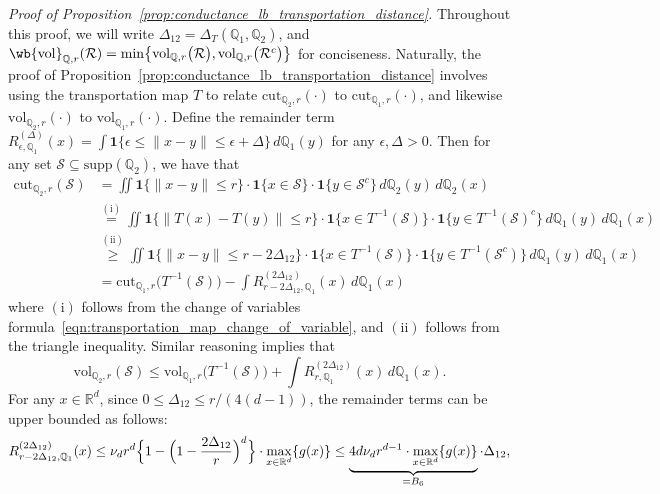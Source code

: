\documentclass[twoside,11pt]{article}
\newcommand{\Reals}{\mathbb{R}}
\newcommand{\1}{\mathbf{1}}
\newcommand{\Rd}{\Reals^d}
\newcommand{\mc}[1]{\mathcal{#1}}
\newcommand{\mbb}[1]{\mathbb{#1}}
\newcommand{\vol}{\mathrm{vol}}
\newcommand{\cut}{\mathrm{cut}}
\begin{document}
\noindent \emph{Proof of Proposition~\ref{prop:conductance_lb_transportation_distance}.}
Throughout this proof, we will write $\Delta_{12} = \Delta_T(\mbb{Q}_1,\mbb{Q}_2)$, and $\wb{\vol}_{\mbb{Q},r}(\mc{R}) = \min\bigl\{\vol_{\mbb{Q},r}\bigl(\mc{R}\bigr),\vol_{\mbb{Q},r}\bigl(\mc{R}^c\bigr)\bigr\}$ for conciseness. Naturally, the proof of Proposition~\ref{prop:conductance_lb_transportation_distance} involves using the transportation map $T$ to relate $\cut_{\mbb{Q}_2,r}(\cdot)$ to $\cut_{\mbb{Q}_1,r}(\cdot)$, and likewise $\vol_{\mbb{Q}_2,r}(\cdot)$ to $\vol_{\mbb{Q}_1,r}(\cdot)$. Define the remainder term $R_{\epsilon,\mbb{Q}_1}^{(\Delta)}(x) = \int \1\{\epsilon \leq \|x - y\| \leq \epsilon + \Delta\} \,d\mbb{Q}_1(y)$ for any $\epsilon, \Delta > 0$. Then for any set $\mc{S} \subseteq \mathrm{supp}(\mbb{Q}_2)$, we have that
\begin{align}
\cut_{\mbb{Q}_2,r}(\mc{S}) & = \iint \1\{\|x - y\|\leq r\} \cdot \1\{x \in \mc{S} \} \cdot \1\{y \in \mc{S}^c \} \,d\mbb{Q}_2(y) \,d\mbb{Q}_2(x) \nonumber \\ 
& \overset{\mathrm{(i)}}{=} \iint \1\{\|T(x) - T(y)\|\leq r\} \cdot \1\{x \in T^{-1}(\mc{S}) \} \cdot \1\{y \in T^{-1}(\mc{S})^c \} \,d\mbb{Q}_1(y) \,d\mbb{Q}_1(x) \nonumber \\
& \overset{\mathrm{(ii)}}{\geq} \iint \1\{\|x - y\|\leq r - 2\Delta_{12}\} \cdot \1\{x \in T^{-1}(\mc{S}) \} \cdot \1\{y \in T^{-1}(\mc{S}^c) \} \,d\mbb{Q}_1(y) \,d\mbb{Q}_1(x) \nonumber \\
& = \cut_{\mbb{Q}_1,r}\bigl(T^{-1}(\mc{S})\bigr) - \int R_{r - 2\Delta_{12} ,\mbb{Q}_1}^{(2\Delta_{12})}(x) \,d\mbb{Q}_1(x) \label{pf:conductance_lb_transportation_distance_1}
\end{align} 
where $\mathrm{(i)}$ follows from the change of variables formula~\eqref{eqn:transportation_map_change_of_variable}, and $\mathrm{(ii)}$ follows from the triangle inequality. Similar reasoning implies that
\begin{equation}
\label{pf:conductance_lb_transportation_distance_2}
\vol_{\mbb{Q}_2,r}(\mc{S}) \leq \vol_{\mbb{Q}_1,r}\bigl(T^{-1}(\mc{S})\bigr) + \int R_{r,\mbb{Q}_1}^{(2\Delta_{12})}(x)  \,d\mbb{Q}_1(x).
\end{equation}
For any $x \in \Rd$, since $0 \leq \Delta_{12} \leq r/(4(d - 1))$, the remainder terms can be upper bounded as follows:
\begin{equation*}
R_{r - 2\Delta_{12} ,\mbb{Q}_1}^{(2\Delta_{12})}(x) \leq \nu_dr^d\Bigl\{1 - \Bigl(1 - \frac{2\Delta_{12}}{r}\Bigr)^d \Bigr\} \cdot \max_{x \in \Rd}\{g(x)\} \leq \underbrace{4 d \nu_d r^{d - 1} \cdot \max_{x \in \Rd}\{g(x)\}}_{= B_6} \cdot \Delta_{12},
\end{equation*}
\end{document}
